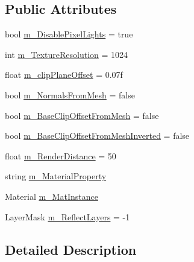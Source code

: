 \subsection*{Public Attributes}
\begin{DoxyCompactItemize}
\item 
bool \mbox{\hyperlink{class_realtime_reflection_1_1_planar_realtime_reflection_a58d087be687cc5e96a9b353eeb319f56}{m\+\_\+\+Disable\+Pixel\+Lights}} = true
\item 
int \mbox{\hyperlink{class_realtime_reflection_1_1_planar_realtime_reflection_af882d1b875397946ba133aa67b576ea0}{m\+\_\+\+Texture\+Resolution}} = 1024
\item 
float \mbox{\hyperlink{class_realtime_reflection_1_1_planar_realtime_reflection_acf688a5ef93b13070dbfeb885707e0fb}{m\+\_\+clip\+Plane\+Offset}} = 0.\+07f
\item 
bool \mbox{\hyperlink{class_realtime_reflection_1_1_planar_realtime_reflection_aaaaee6fdbf06b6d23b2a571c72669332}{m\+\_\+\+Normals\+From\+Mesh}} = false
\item 
bool \mbox{\hyperlink{class_realtime_reflection_1_1_planar_realtime_reflection_a065f516da6e900ad91f8d6ab30e802ca}{m\+\_\+\+Base\+Clip\+Offset\+From\+Mesh}} = false
\item 
bool \mbox{\hyperlink{class_realtime_reflection_1_1_planar_realtime_reflection_a76bc6912dececb819abe629b7474bf66}{m\+\_\+\+Base\+Clip\+Offset\+From\+Mesh\+Inverted}} = false
\item 
float \mbox{\hyperlink{class_realtime_reflection_1_1_planar_realtime_reflection_a203518fc9f22985536f28253085d91e2}{m\+\_\+\+Render\+Distance}} = 50
\item 
string \mbox{\hyperlink{class_realtime_reflection_1_1_planar_realtime_reflection_a8942f36159d4fe5e48265046c3dd9eac}{m\+\_\+\+Material\+Property}}
\item 
Material \mbox{\hyperlink{class_realtime_reflection_1_1_planar_realtime_reflection_afed50482812f0a372ed21c168914b1e1}{m\+\_\+\+Mat\+Instance}}
\item 
Layer\+Mask \mbox{\hyperlink{class_realtime_reflection_1_1_planar_realtime_reflection_ac4cf6a2566a1a6bef49ac5133aee40af}{m\+\_\+\+Reflect\+Layers}} = -\/1
\end{DoxyCompactItemize}


\subsection{Detailed Description}


